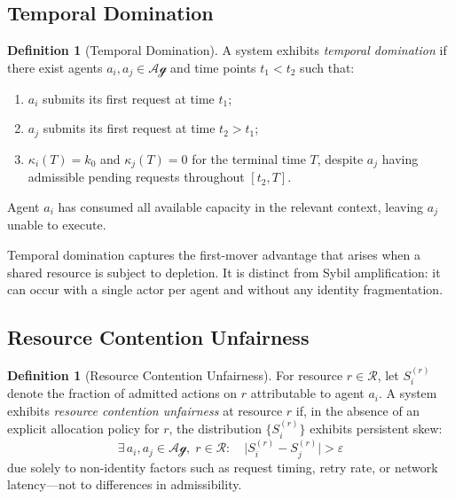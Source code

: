 \documentclass[11pt]{article}
\theoremstyle{plain}
\theoremstyle{definition}
\newtheorem{definition}[theorem]{Definition}
\theoremstyle{remark}
\newcommand{\Agents}{\mathcal{Ag}}         %
\newcommand{\Resources}{\mathcal{R}}       %
\newcommand{\Share}[1]{S_{#1}}             %
\newcommand{\kbound}{k_0}                  %
\begin{document}
\subsection{Temporal Domination}
\label{sec:temporal-dom}

\begin{definition}[Temporal Domination]
\label{def:temporal-dom}
A system exhibits \emph{temporal domination} if there exist agents
$a_i, a_j \in \Agents$ and time points $t_1 < t_2$ such that:
\begin{enumerate}[label=(\roman*)]
  \item $a_i$ submits its first request at time $t_1$;
  \item $a_j$ submits its first request at time $t_2 > t_1$;
  \item $\kappa_i(T) = \kbound$ and $\kappa_j(T) = 0$ for the
    terminal time $T$, despite $a_j$ having admissible pending
    requests throughout $[t_2, T]$.
\end{enumerate}
Agent $a_i$ has consumed all available capacity in the relevant
context, leaving $a_j$ unable to execute.
\end{definition}

Temporal domination captures the first-mover advantage that arises
when a shared resource is subject to depletion.  It is distinct from
Sybil amplification: it can occur with a single actor per agent and
without any identity fragmentation.

\subsection{Resource Contention Unfairness}
\label{sec:contention}

\begin{definition}[Resource Contention Unfairness]
\label{def:contention}
For resource $r \in \Resources$, let $\Share{i}^{(r)}$ denote the
fraction of admitted actions on $r$ attributable to agent $a_i$.
A system exhibits \emph{resource contention unfairness} at resource $r$
if, in the absence of an explicit allocation policy for $r$, the
distribution $\{\Share{i}^{(r)}\}$ exhibits persistent skew:
\[
  \exists\, a_i, a_j \in \Agents, \; r \in \Resources :
  \quad \bigl|\Share{i}^{(r)} - \Share{j}^{(r)}\bigr| > \varepsilon
\]
due solely to non-identity factors such as request timing, retry rate,
or network latency---not to differences in admissibility.
\end{definition}

\end{document}
